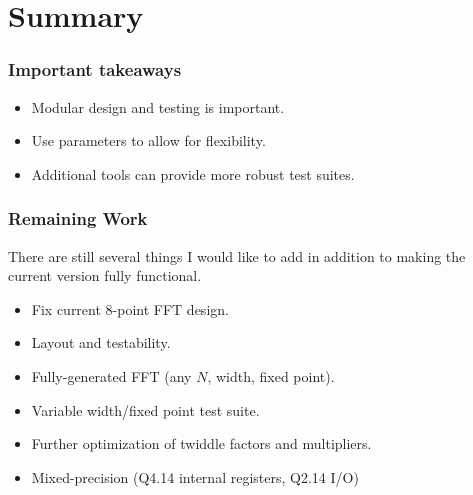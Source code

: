 \documentclass{beamer}
\begin{document}
\section{Summary}

\begin{frame}
	\frametitle{Important takeaways}
	\begin{itemize}
		\item Modular design and testing is important.
		\item Use parameters to allow for flexibility.
		\item Additional tools can provide more robust test suites.
	\end{itemize}

\end{frame}

\begin{frame}
	\frametitle{Remaining Work}
	There are still several things I would like to add in addition to making
	the current version fully functional.
	\begin{itemize}
		\item Fix current 8-point FFT design.
		\item Layout and testability.
		\item Fully-generated FFT (any $N$, width, fixed point).
		\item Variable width/fixed point test suite.
		\item Further optimization of twiddle factors and multipliers.
		\item Mixed-precision (Q4.14 internal registers, Q2.14 I/O)
	\end{itemize}

\end{frame}
\end{document}
